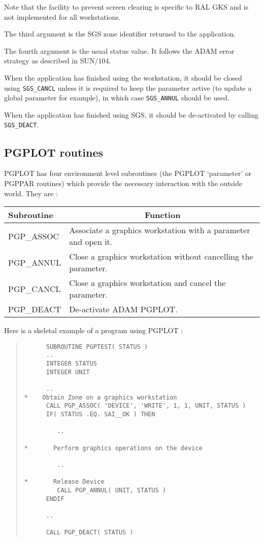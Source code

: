 Note that the facility to prevent screen clearing is specific to RAL GKS and
is not implemented for all workstations.

The third argument is the SGS zone identifier returned to the application.

The fourth argument is the usual status value. It follows the ADAM error
strategy as described in SUN/104.

When the application has finished using the workstation, it should be closed
using {\tt SGS\_CANCL} unless it is required to keep the parameter active 
(to update a global parameter for example), in which case {\tt SGS\_ANNUL} 
should be used.

When the application has finished using SGS, it should be de-activated by
calling {\tt SGS\_DEACT}.

\subsection{PGPLOT routines}
\label{pgplot}

PGPLOT has four environment level subroutines (the PGPLOT `parameter' or PGPPAR 
routines) which provide the necessary interaction with the outside world.
They are :

\begin{center}
\begin{tabular}{||l|l||} \hline
Subroutine & \multicolumn{1}{c||}{Function} \\ \hline
PGP\_ASSOC  & Associate a graphics workstation with a parameter and open it.\\
PGP\_ANNUL  & Close a graphics workstation without cancelling the parameter.\\
PGP\_CANCL  & Close a graphics workstation and cancel the parameter.\\
PGP\_DEACT  & De-activate ADAM PGPLOT.\\ \hline
\end{tabular}
\end{center}

Here is a skeletal example of a program using PGPLOT :
\begin{quote}
\begin{verbatim}
      SUBROUTINE PGPTEST( STATUS )
      ..
      INTEGER STATUS
      INTEGER UNIT

      ..
*    Obtain Zone on a graphics workstation
      CALL PGP_ASSOC( 'DEVICE', 'WRITE', 1, 1, UNIT, STATUS )
      IF( STATUS .EQ. SAI__OK ) THEN

         ..

*       Perform graphics operations on the device

         ..

*       Release Device
         CALL PGP_ANNUL( UNIT, STATUS )
      ENDIF

      ..

      CALL PGP_DEACT( STATUS )

\end{verbatim}
\end{quote}

